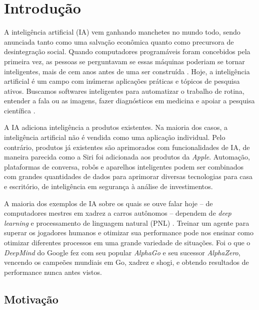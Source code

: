\chapter{Introdução}
\label{chap:intro}

A inteligência artificial (IA) vem ganhando manchetes no mundo todo, sendo anunciada tanto como uma salvação econômica quanto como precursora de desintegração social. Quando computadores programáveis foram concebidos pela primeira vez, as pessoas se perguntavam se essas máquinas poderiam se tornar inteligentes, mais de cem anos antes de uma ser construída %
\cite{menabrea1843sketch}.
 Hoje, a inteligência artificial é um campo com inúmeras aplicações práticas e tópicos de pesquisa ativos. Buscamos softwares inteligentes para automatizar o trabalho de rotina, entender a fala ou as imagens, fazer diagnósticos em medicina e apoiar a pesquisa científica \cite{Goodfellow-et-al-2016}.


A IA adiciona inteligência a produtos existentes. Na maioria dos casos, a inteligência artificial não é vendida como uma aplicação individual. Pelo contrário, produtos já existentes são aprimorados com funcionalidades de IA, de maneira parecida como a Siri foi adicionada aos produtos da \textit{Apple}. Automação, plataformas de conversa, robôs e aparelhos inteligentes podem ser combinados com grandes quantidades de dados para aprimorar diversas tecnologias para casa e escritório, de inteligência em segurança à análise de investimentos.

A maioria dos exemplos de IA sobre os quais se ouve falar hoje – de computadores mestres em xadrez a carros autônomos – dependem de \textit{deep learning} e processamento de linguagem natural (PNL) \cite{pln-o-que-e}. Treinar um agente para superar os jogadores humanos e otimizar sua performance pode nos ensinar como otimizar diferentes processos em uma grande variedade de situações. Foi o que o \textit{DeepMind} do Google fez com seu popular \textit{AlphaGo} e seu sucessor \textit{AlphaZero}, vencendo os campeões mundiais em Go, xadrez e shogi, e obtendo resultados de performance nunca antes vistos.

\section{Motivação}

